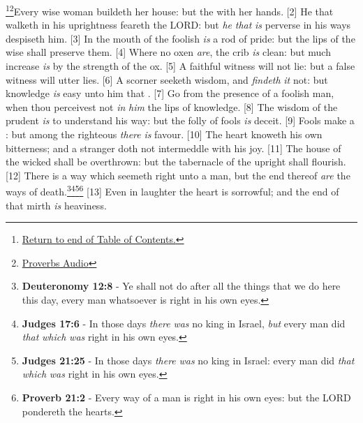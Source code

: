 \footnote{\textcolor[cmyk]{0.99998,1,0,0}{\hyperlink{TOC}{Return to end of Table of Contents.}}}\footnote{\href{https://audiobible.com/bible/proverbs_14.html}{\textcolor[cmyk]{0.99998,1,0,0}{Proverbs Audio}}}\textcolor[cmyk]{0.99998,1,0,0}{Every wise woman buildeth her house: but the  with her hands.}
[2] \textcolor[cmyk]{0.99998,1,0,0}{He that walketh in his uprightness feareth the LORD: but \emph{he} \emph{that} \emph{is} perverse in his ways despiseth him.}
[3] \textcolor[cmyk]{0.99998,1,0,0}{In the mouth of the foolish \emph{is} a rod of pride: but the lips of the wise shall preserve them.}
[4] \textcolor[cmyk]{0.99998,1,0,0}{Where no oxen \emph{are}, the crib \emph{is} clean: but much increase \emph{is} by the strength of the ox.}
[5] \textcolor[cmyk]{0.99998,1,0,0}{A faithful witness will not lie: but a false witness will utter lies.}
[6] \textcolor[cmyk]{0.99998,1,0,0}{A scorner seeketh wisdom, and \emph{findeth} \emph{it} not: but knowledge \emph{is} easy unto him that .}
[7] \textcolor[cmyk]{0.99998,1,0,0}{Go from the presence of a foolish man, when thou perceivest not \emph{in} \emph{him} the lips of knowledge.}
[8] \textcolor[cmyk]{0.99998,1,0,0}{The wisdom of the prudent \emph{is} to understand his way: but the folly of fools \emph{is} deceit.}
[9] \textcolor[cmyk]{0.99998,1,0,0}{Fools make a : but among the righteous \emph{there} \emph{is} favour.}
[10] \textcolor[cmyk]{0.99998,1,0,0}{The heart knoweth his own bitterness; and a stranger doth not intermeddle with his joy.}
[11] \textcolor[cmyk]{0.99998,1,0,0}{The house of the wicked shall be overthrown: but the tabernacle of the upright shall flourish.}
[12] \textcolor[cmyk]{0.99998,1,0,0}{There is a way which seemeth right unto a man, but the end thereof \emph{are} the ways of death.}\footnote{\textbf{Deuteronomy 12:8} - Ye shall not do after all the things that we do here this day, every man whatsoever is right in his own eyes.}\footnote{\textbf{Judges 17:6} - In those days \emph{there} \emph{was} no king in Israel, \emph{but} every man did \emph{that} \emph{which} \emph{was} right in his own eyes.}\footnote{\textbf{Judges 21:25} - In those days \emph{there} \emph{was} no king in Israel: every man did \emph{that} \emph{which} \emph{was} right in his own eyes.}\footnote{\textbf{Proverb 21:2} - Every way of a man is right in his own eyes: but the LORD pondereth the hearts.}
[13] \textcolor[cmyk]{0.99998,1,0,0}{Even in laughter the heart is sorrowful; and the end of that mirth \emph{is} heaviness.}
